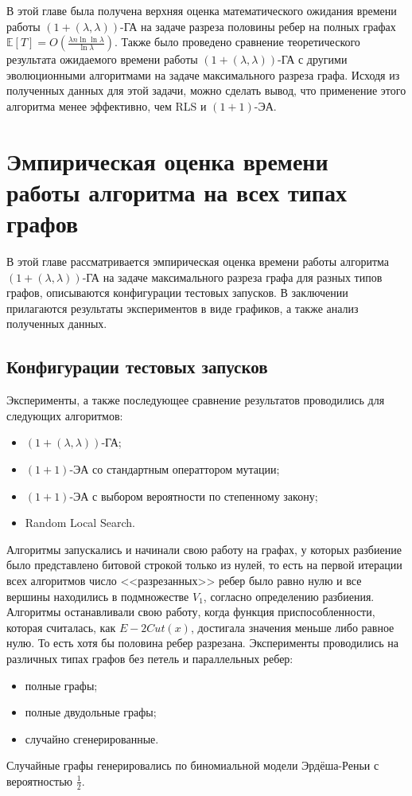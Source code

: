 \documentclass[times]{itmo-student-thesis}
\newcommand{\alglambdaf}{${(1 + (\lambda , \lambda))}$-ГА\xspace}
\newcommand{\oea}{\mbox{$(1 + 1)$-ЭА}\xspace}
\begin{document}
\chapterconclusion

В этой главе была получена верхняя оценка математического ожидания времени работы \alglambdaf на задаче разреза половины ребер на полных графах $\mathbb{E}[T]=O\left(\frac{\lambda n\ln \ln \lambda}{\ln \lambda}\right)$. Также было проведено сравнение теоретического результата ожидаемого времени работы \alglambdaf с другими эволюционными алгоритмами на задаче максимального разреза графа. Исходя из полученных данных для этой задачи, можно сделать вывод, что применение этого алгоритма менее эффективно, чем RLS и \oea.


\chapter{Эмпирическая оценка времени работы алгоритма на всех типах графов}
В этой главе рассматривается эмпирическая оценка времени работы алгоритма \alglambdaf на задаче максимального разреза графа для разных типов графов, описываются конфигурации тестовых запусков. В заключении прилагаются результаты экспериментов в виде графиков, а также анализ полученных данных.

\section{Конфигурации тестовых запусков}
Эксперименты, а также последующее сравнение результатов проводились для следующих алгоритмов:
\begin{itemize}
 \item \alglambdaf;
 \item \oea со стандартным операттором мутации;
 \item \oea с выбором вероятности по степенному закону;
 \item Random Local Search.
\end{itemize}
Алгоритмы запускались и начинали свою работу на графах, у которых разбиение было представлено битовой строкой только из нулей, то есть на первой итерации всех алгоритмов число <<разрезанных>> ребер было равно нулю и все вершины находились в подмножестве $V_1$, согласно определению разбиения. Алгоритмы останавливали свою работу, когда функция приспособленности, которая считалась, как $E - 2Cut(x)$, достигала значения меньше либо равное нулю. То есть хотя бы половина ребер разрезана.
Эксперименты проводились на различных типах графов без петель и параллельных ребер:
\begin{itemize}
 \item полные графы;
 \item полные двудольные графы;
 \item случайно сгенерированные.
\end{itemize}
Случайные графы генерировались по биномиальной модели Эрдёша-Реньи с вероятностью $\frac{1}{2}$.
\end{document}
